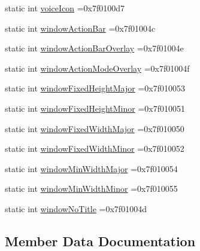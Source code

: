 \begin{DoxyCompactItemize}
\item 
static int \hyperlink{classandroid_1_1support_1_1v7_1_1recyclerview_1_1R_1_1attr_ae34a0ca90a8a69d3c999302d5d714564}{voice\+Icon} =0x7f0100d7
\item 
static int \hyperlink{classandroid_1_1support_1_1v7_1_1recyclerview_1_1R_1_1attr_aa0eb0b94b9c010e44a1e95f76cb569ea}{window\+Action\+Bar} =0x7f01004c
\item 
static int \hyperlink{classandroid_1_1support_1_1v7_1_1recyclerview_1_1R_1_1attr_a3d91a274065951b67649e3a0d462f765}{window\+Action\+Bar\+Overlay} =0x7f01004e
\item 
static int \hyperlink{classandroid_1_1support_1_1v7_1_1recyclerview_1_1R_1_1attr_a61961ac2ae9e9c1aea6ddbadec38a189}{window\+Action\+Mode\+Overlay} =0x7f01004f
\item 
static int \hyperlink{classandroid_1_1support_1_1v7_1_1recyclerview_1_1R_1_1attr_a23b8af4efc3f70221f19629b04a8ce69}{window\+Fixed\+Height\+Major} =0x7f010053
\item 
static int \hyperlink{classandroid_1_1support_1_1v7_1_1recyclerview_1_1R_1_1attr_aed93b3ff11b45886f6d7ea4b7bf4f098}{window\+Fixed\+Height\+Minor} =0x7f010051
\item 
static int \hyperlink{classandroid_1_1support_1_1v7_1_1recyclerview_1_1R_1_1attr_a93959c8030eab1a88df8ce823c050197}{window\+Fixed\+Width\+Major} =0x7f010050
\item 
static int \hyperlink{classandroid_1_1support_1_1v7_1_1recyclerview_1_1R_1_1attr_a81a2e241e22776f9fc760d2d2862b7cc}{window\+Fixed\+Width\+Minor} =0x7f010052
\item 
static int \hyperlink{classandroid_1_1support_1_1v7_1_1recyclerview_1_1R_1_1attr_af3ebf027ce0b39b9865c14947839e898}{window\+Min\+Width\+Major} =0x7f010054
\item 
static int \hyperlink{classandroid_1_1support_1_1v7_1_1recyclerview_1_1R_1_1attr_af8259c37635b88a25eec7b014cb1cb19}{window\+Min\+Width\+Minor} =0x7f010055
\item 
static int \hyperlink{classandroid_1_1support_1_1v7_1_1recyclerview_1_1R_1_1attr_ad6cd604a9df8182704ee2296b32ab653}{window\+No\+Title} =0x7f01004d
\end{DoxyCompactItemize}


\subsection{Member Data Documentation}
\mbox{\label{classandroid_1_1support_1_1v7_1_1recyclerview_1_1R_1_1attr_a73ed8c96e546616907597658c4171684}} 
